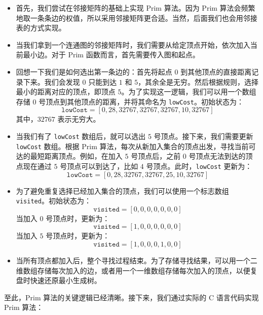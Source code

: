 \documentclass[lang=cn,newtx,10pt,scheme=chinese]{../elegantbook}
\begin{document}
\begin{itemize}
  \item 首先，我们尝试在邻接矩阵的基础上实现 Prim 算法。因为 Prim 算法会频繁地取一条条边的权值，所以采用邻接矩阵更合适。当然，后面我们也会用邻接表的方式实现。
  
  \item 当我们拿到一个连通图的邻接矩阵时，我们需要从给定顶点开始，依次加入当前最小边。对于 Prim 函数而言，首先需要传入图和起点。

  \item 回想一下我们是如何选出第一条边的：首先将起点 $0$ 到其他顶点的直接距离记录下来。我们会发现 $0$ 只能到达 $1$ 和 $5$，其余全是无穷。然后根据规则，选择最小的距离对应的顶点，即顶点 $5$。为了实现这一逻辑，我们可以用一个数组存储 $0$ 号顶点到其他顶点的距离，并将其命名为 \texttt{lowCost}。初始状态为：
  \[
  \texttt{lowCost} = [0, 28, 32767, 32767, 32767, 10, 32767]
  \]
  其中，$32767$ 表示无穷大。

  \item 当我们有了 \texttt{lowCost} 数组后，就可以选出 $5$ 号顶点。接下来，我们需要更新 \texttt{lowCost} 数组。根据 Prim 算法，每次从新加入集合的顶点出发，寻找当前可达的最短距离顶点。例如，在加入 $5$ 号顶点后，之前 $0$ 号顶点无法到达的顶点现在通过 $5$ 号顶点可以到达了，比如 $4$ 号顶点。此时，\texttt{lowCost} 更新为：
  \[
  \texttt{lowCost} = [0, 28, 32767, 32767, 25, 10, 32767]
  \]

  \item 为了避免重复选择已经加入集合的顶点，我们可以使用一个标志数组 \texttt{visited}。初始状态为：
  \[
  \texttt{visited} = [0, 0, 0, 0, 0, 0, 0]
  \]
  当加入 $0$ 号顶点时，更新为：
  \[
  \texttt{visited} = [1, 0, 0, 0, 0, 0, 0]
  \]
  当加入 $5$ 号顶点时，更新为：
  \[
  \texttt{visited} = [1, 0, 0, 0, 1, 0, 0]
  \]

  \item 当所有顶点都加入后，整个寻找过程结束。为了存储寻找结果，可以用一个二维数组存储每次加入的边，或者用一个一维数组存储每次加入的顶点，以便复盘时快速还原最小生成树。
\end{itemize}

至此，Prim 算法的关键逻辑已经清晰。接下来，我们通过实际的 C 语言代码实现 Prim 算法：
\end{document}
